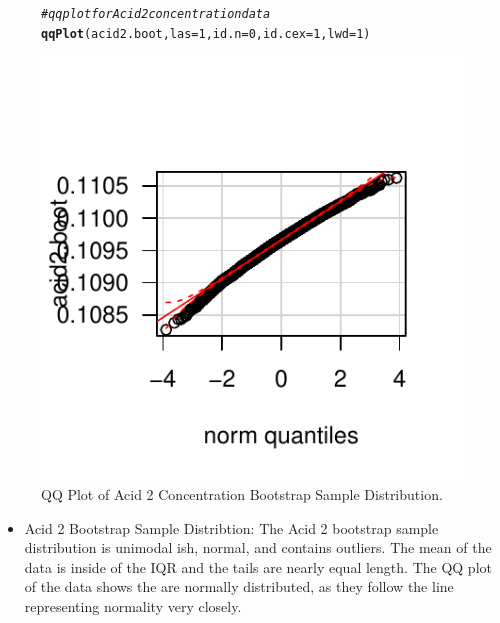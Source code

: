 \documentclass{article}\usepackage[]{graphicx}\usepackage[]{color}
\makeatletter
\def\maxwidth{ %
  \ifdim\Gin@nat@width>\linewidth
    \linewidth
  \else
    \Gin@nat@width
  \fi
}
\newcommand{\hlnum}[1]{\textcolor[rgb]{0.686,0.059,0.569}{#1}}%
\newcommand{\hlcom}[1]{\textcolor[rgb]{0.678,0.584,0.686}{\textit{#1}}}%
\newcommand{\hlstd}[1]{\textcolor[rgb]{0.345,0.345,0.345}{#1}}%
\newcommand{\hlkwc}[1]{\textcolor[rgb]{0.333,0.667,0.333}{#1}}%
\newcommand{\hlkwd}[1]{\textcolor[rgb]{0.737,0.353,0.396}{\textbf{#1}}}%
\newenvironment{kframe}{%
 \def\at@end@of@kframe{}%
 \ifinner\ifhmode%
  \def\at@end@of@kframe{\end{minipage}}%
  \begin{minipage}{\columnwidth}%
 \fi\fi%
 \def\FrameCommand##1{\hskip\@totalleftmargin \hskip-\fboxsep
 \colorbox{shadecolor}{##1}\hskip-\fboxsep
     \hskip-\linewidth \hskip-\@totalleftmargin \hskip\columnwidth}%
 \MakeFramed {\advance\hsize-\width
   \@totalleftmargin\z@ \linewidth\hsize
   \@setminipage}}%
 {\par\unskip\endMakeFramed%
 \at@end@of@kframe}
\newenvironment{knitrout}{}{} %
\makeatother
\begin{document}
\begin{figure}[H]  \begin{center}
\begin{knitrout}
\color{fgcolor}\begin{kframe}
\begin{alltt}
\hlcom{# qq plot for Acid 2 concentration data}
\hlkwd{qqPlot}\hlstd{(acid2.boot,} \hlkwc{las} \hlstd{=} \hlnum{1}\hlstd{,} \hlkwc{id.n} \hlstd{=} \hlnum{0}\hlstd{,} \hlkwc{id.cex} \hlstd{=} \hlnum{1}\hlstd{,} \hlkwc{lwd} \hlstd{=} \hlnum{1}\hlstd{)}
\end{alltt}
\end{kframe}
\includegraphics[width=\maxwidth]{figure/2_acid2_qqbott} 

\end{knitrout}
\end{center}\caption{QQ Plot of Acid 2 Concentration Bootstrap Sample Distribution.} \end{figure}

\begin{itemize}
\item Acid 2 Bootstrap Sample Distribtion:  The Acid 2 bootstrap sample distribution is unimodal ish, normal, and contains outliers.  The mean of the data is inside of the IQR and the tails are nearly equal length. The QQ plot of the data shows the are normally distributed, as they follow the line representing normality very closely.
\end{itemize}
\end{document}
